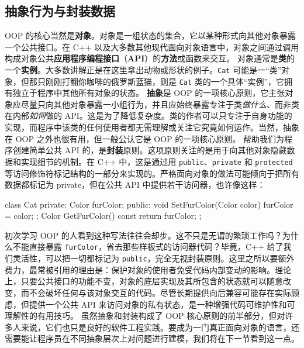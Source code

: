 \subsection{抽象行为与封装数据}
\label{idx:idx_7d72d596}
\label{idx:idx_d7ffa318}
OOP 的核心当然是\textbf{对象}。对象是一组状态的集合，它以某种形式向其他对象暴露一个公共接口。在 C++ 以及大多数其他现代面向对象语言中，对象之间通过调用构成对象公共\textbf{应用程序编程接口}（\textbf{API}）的\textbf{方法}或函数来交互。
对象通常是\textbf{类}的一个\textbf{实例}。大多数讲解正是在这里拿出动物或形状的例子。\texttt{Cat} 可能是一“类”对象，但那只刚刚打翻你咖啡的俄罗斯蓝猫，则是 \texttt{Cat} 类的一个具体“实例”，它拥有独立于程序中其他所有对象的状态。
\label{idx:idx_94f03168}
\textbf{抽象}是 OOP 的一项核心原则，它主张对象应尽量只向其他对象暴露一小组行为，并且应始终暴露专注于类\emph{做什么}、而非类在内部\emph{如何}做的 API。这是为了降低复杂度。类的作者可以只专注于自身功能的实现，而程序中该类的任何使用者都无需理解或关注它究竟如何运作。当然，抽象在 OOP 之外也很有用，但一般公认它是 OOP 的一项核心原则。
\label{idx:idx_3d3e492b}
帮助我们为程序创建简单公共 API 的，是\textbf{封装}原则。这项原则关注的是用于向其他对象隐藏数据和实现细节的机制。在 C++ 中，这是通过用 \texttt{public}、\texttt{private} 和 \texttt{protected} 等访问修饰符标记结构的一部分来实现的。严格面向对象的做法可能倾向于把所有数据都标记为 private，但在公共 API 中提供若干访问器，也许像这样：
\begin{codebox}[rust]
class Cat {
private:
      Color furColor;
public:
      void SetFurColor(Color color) { furColor = color; };
      Color GetFurColor() const { return furColor; }
};
\end{codebox}
\label{idx:idx_e85c021b}
\label{idx:idx_91e22270}
初次学习 OOP 的人看到这种写法往往会却步。这不只是无谓的繁琐工作吗？为什么不能直接暴露 \texttt{furColor}，省去那些样板式的访问器代码？毕竟，C++ 给了我们灵活性，可以把一切都标记为 \texttt{public}，完全无视封装原则。这里之所以要额外费力，最常被引用的理由是：保护对象的使用者免受代码内部变动的影响。理论上，只要公共接口的功能不变，对象的底层实现及其所包含的状态就可以随意改变，而不会破坏任何与该对象交互的代码。尽管长期提供向后兼容可能存在实际顾虑，但提供一个公共 API 来访问对象的私有状态，是一种增强代码可维护性和可理解性的有用技巧。
虽然抽象和封装构成了 OOP 核心原则的前半部分，但对许多人来说，它们也只是良好的软件工程实践。要成为一门真正面向对象的语言，还需要能让程序员在不同抽象层次上对问题进行建模，我们将在下一节看到这一点。
